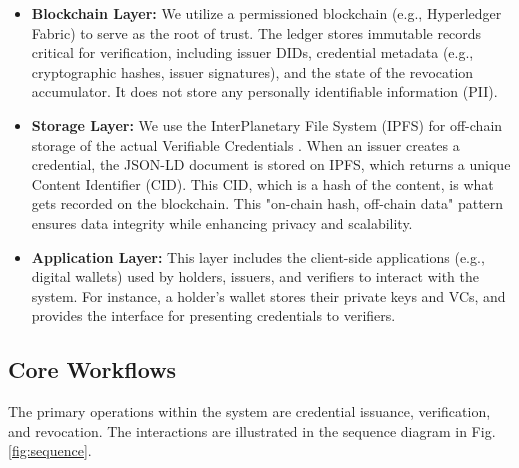 \documentclass[lettersize,journal]{IEEEtran}
\begin{document}

\begin{itemize}
    \item \textbf{Blockchain Layer:} We utilize a permissioned blockchain (e.g., Hyperledger Fabric) to serve as the root of trust. The ledger stores immutable records critical for verification, including issuer DIDs, credential metadata (e.g., cryptographic hashes, issuer signatures), and the state of the revocation accumulator. It does not store any personally identifiable information (PII).
    \item \textbf{Storage Layer:} We use the InterPlanetary File System (IPFS) for off-chain storage of the actual Verifiable Credentials \cite{IPFS2023}. When an issuer creates a credential, the JSON-LD document is stored on IPFS, which returns a unique Content Identifier (CID). This CID, which is a hash of the content, is what gets recorded on the blockchain. This "on-chain hash, off-chain data" pattern ensures data integrity while enhancing privacy and scalability.
    \item \textbf{Application Layer:} This layer includes the client-side applications (e.g., digital wallets) used by holders, issuers, and verifiers to interact with the system. For instance, a holder's wallet stores their private keys and VCs, and provides the interface for presenting credentials to verifiers.
\end{itemize}

\subsection{Core Workflows}
The primary operations within the system are credential issuance, verification, and revocation. The interactions are illustrated in the sequence diagram in Fig. \ref{fig:sequence}.

\end{document}
